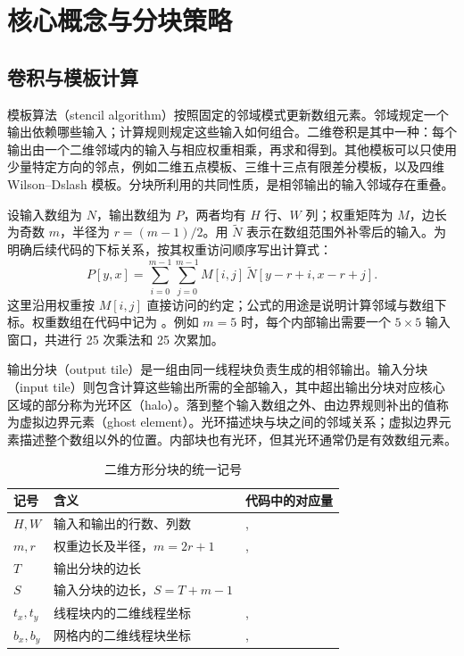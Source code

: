 \section{核心概念与分块策略}
\label{l9:sec:orientation}

\subsection{卷积与模板计算}
模板算法（stencil algorithm）按照固定的邻域模式更新数组元素。邻域规定一个输出依赖哪些输入；计算规则规定这些输入如何组合。二维卷积是其中一种：每个输出由一个二维邻域内的输入与相应权重相乘，再求和得到。其他模板可以只使用少量特定方向的邻点，例如二维五点模板、三维十三点有限差分模板，以及四维 Wilson--Dslash 模板。分块所利用的共同性质，是相邻输出的输入邻域存在重叠。

设输入数组为 $N$，输出数组为 $P$，两者均有 $H$ 行、$W$ 列；权重矩阵为 $M$，边长为奇数 $m$，半径为 $r=(m-1)/2$。用 $\widetilde N$ 表示在数组范围外补零后的输入。为明确后续代码的下标关系，按其权重访问顺序写出计算式：
\begin{equation}
 P[y,x]=\sum_{i=0}^{m-1}\sum_{j=0}^{m-1}
 M[i,j]\,\widetilde N[y-r+i,x-r+j].
 \label{l9:eq:convolution}
\end{equation}
这里沿用权重按 $M[i,j]$ 直接访问的约定；公式的用途是说明计算邻域与数组下标。权重数组在代码中记为 \mbox{}。例如 $m=5$ 时，每个内部输出需要一个 $5\times5$ 输入窗口，共进行 25 次乘法和 25 次累加。

输出分块（output tile）是一组由同一线程块负责生成的相邻输出。输入分块（input tile）则包含计算这些输出所需的全部输入，其中超出输出分块对应核心区域的部分称为光环区（halo）。落到整个输入数组之外、由边界规则补出的值称为虚拟边界元素（ghost element）。光环描述块与块之间的邻域关系；虚拟边界元素描述整个数组以外的位置。内部块也有光环，但其光环通常仍是有效数组元素。

\begin{table}[htbp]
\centering\small
\caption{二维方形分块的统一记号}
\label{l9:tab:notation}
\begin{tabularx}{\textwidth}{@{}lYl@{}}\toprule
记号 & 含义 & 代码中的对应量\\\midrule
$H,W$ & 输入和输出的行数、列数 & \mbox{}, \mbox{}\\
$m,r$ & 权重边长及半径，$m=2r+1$ & \mbox{}, \mbox{}\\
$T$ & 输出分块的边长 & \mbox{}\\
$S$ & 输入分块的边长，$S=T+m-1$ & \mbox{}\\
$t_x,t_y$ & 线程块内的二维线程坐标 & \mbox{}, \mbox{}\\
$b_x,b_y$ & 网格内的二维线程块坐标 & \mbox{}, \mbox{}\\\bottomrule
\end{tabularx}
\end{table}


